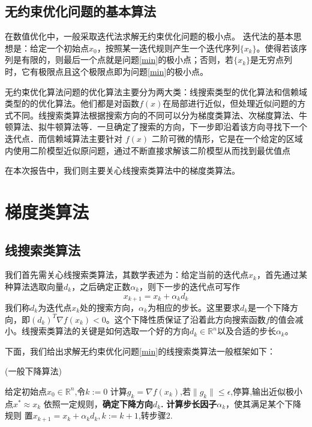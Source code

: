 \subsection{无约束优化问题的基本算法}

在数值优化中，一般采取迭代法求解无约束优化问题的极小点。
迭代法的基本思想是：给定一个初始点$ x_{0} $，按照某一迭代规则产生一个迭代序列$ \{ x_{k}\}$。使得若该序列是有限的，则最后一个点就是问题\ref{min}的极小点；否则，若$ \{ x_{k}\} $是无穷点列时，它有极限点且这个极限点即为问题\ref{min}的极小点。

无约束优化算法问题的优化算法主要分为两大类：线搜索类型的优化算法和信赖域类型的的优化算法。他们都是对函数$ f(x) $在局部进行近似，但处理近似问题的方式不同。线搜索类算法根据搜索方向的不同可以分为梯度类算法、次梯度算法、牛顿算法、拟牛顿算法等．一旦确定了搜索的方向，下一步即沿着该方向寻找下一个迭代点．而信赖域算法主要针对 $ f(x) $ 二阶可微的情形，它是在一个给定的区域内使用二阶模型近似原问题，通过不断直接求解该二阶模型从而找到最优值点\cite{刘浩洋2021最优化}

在本次报告中，我们则主要关心线搜索类算法中的梯度类算法。

\section{\hei 梯度类算法}
\subsection{线搜索类算法}

我们首先需关心线搜索类算法，其数学表述为：给定当前的迭代点$ x_{k} $，首先通过某种算法选取向量$ d_{k} $，之后确定正数$ \alpha_{k} $，则下一步的迭代点可写作
\begin{equation}
	x_{k+1}=x_{k}+\alpha_{k}d_{k}
\end{equation}
我们称$ d_{k} $为迭代点$x_{k}  $处的搜索方向，$  \alpha_{k}$为相应的步长。这里要求$ d_{k} $是一个下降方向，即$ (d_{k})^{T} \nabla f(x_{k}) <0$。这个下降性质保证了沿着此方向搜索函数$ f $的值会减小。线搜索类算法的关键是如何选取一个好的方向$ d_{k} \in \mathbb{R}^{n} $以及合适的步长$  \alpha_{k}$。

下面，我们给出求解无约束优化问题\ref{min}的线搜索类算法一般框架如下：

\begin{algorithm}[H]	
	\caption{(一般下降算法)}
	\renewcommand{\algorithmicrequire}{\textbf{输入:}} 
	\renewcommand{\algorithmicensure}{\textbf{输出:}}
	
	\begin{algorithmic}[1]
		\State  给定初始点$ x_{0} \in \mathbb{R}^{n} $,令$ k:=0 $
		\State  计算$ g_{k}=\nabla f(x_{k}) $,若$ \| g_{k} \| \leq \epsilon$,停算,输出近似极小点$ x^{*} \approx x_{k} $
		\State  依照一定规则，\textbf{确定下降方向$ d_{k} $.}
		\State  \textbf{计算步长因子$ \alpha_{k} $}，使其满足某个下降规则
		\State  置$ x_{k+1} = x_{k}+\alpha_{k}d_{k}, k:=k+1 $,转步骤2.
	\end{algorithmic}
\end{algorithm}	

